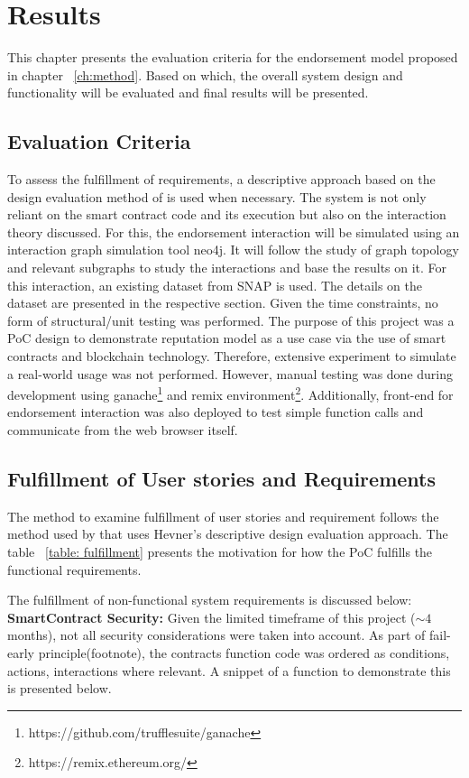 \chapter{Results} \label{ch:results}
This chapter presents the evaluation criteria for the endorsement model
proposed in chapter ~\ref{ch:method}. Based on which, the overall system design
and functionality will be evaluated and final results will be presented. 

\section{Evaluation Criteria}
To assess the fulfillment of requirements, a descriptive approach
based on the design evaluation method of \cite{hevner2010design} is used when
necessary. The system is not only reliant on the smart contract code and its
execution but also on the interaction theory discussed. For this, the
endorsement interaction will be simulated using an interaction graph simulation
tool neo4j. It will follow the study of graph topology and relevant subgraphs
to study the interactions and base the results on it. For this interaction, an
existing dataset from SNAP\cite{snapnets} is used. The details on the dataset
are presented in the respective section.  Given the time constraints, no form
of structural/unit testing was performed. The purpose of this project was a PoC
design to demonstrate reputation model as a use case via the use of smart
contracts and blockchain technology. Therefore, extensive experiment to
simulate a real-world usage was not performed. However, manual testing was done
during development using
ganache\footnote{https://github.com/trufflesuite/ganache} and remix
environment\footnote{https://remix.ethereum.org/}. Additionally, front-end for
endorsement interaction was also deployed to test simple function calls and
communicate from the web browser itself. 

\section{Fulfillment of User stories and Requirements}
The method to examine fulfillment of user stories and requirement follows the
method used by \cite{Bergquist1107612} that uses Hevner's descriptive design
evaluation approach\cite{hevner2010design}. The table ~\ref{table: fulfillment}
presents the motivation for how the PoC fulfills the functional requirements. 

The fulfillment of non-functional system requirements is discussed below:\\
\textbf{SmartContract Security:} Given the limited timeframe of this project
($\sim{4}$ months), not all security considerations were taken into account. As
part of fail-early principle(footnote), the contracts function code was ordered
as conditions, actions, interactions where relevant. A snippet of a function to
demonstrate this is presented below. 

